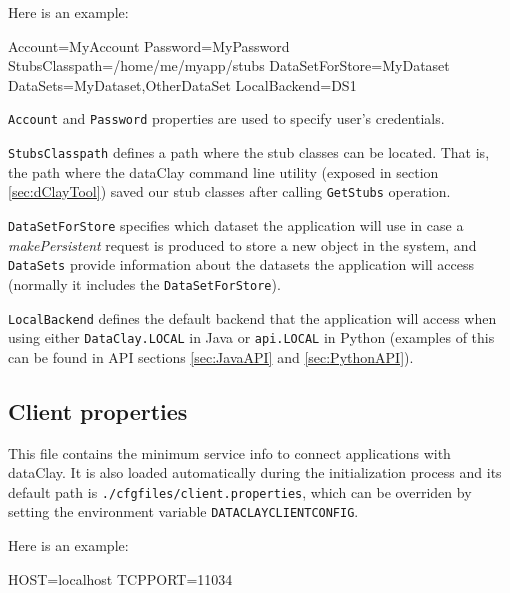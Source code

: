Here is an example:

\begin{tBox}
 \begin{bash}
  Account=MyAccount
  Password=MyPassword
  StubsClasspath=/home/me/myapp/stubs
  DataSetForStore=MyDataset
  DataSets=MyDataset,OtherDataSet
  LocalBackend=DS1
 \end{bash}
\end{tBox}

\texttt{Account} and \texttt{Password} properties are used to specify user's credentials. 

\texttt{StubsClasspath} defines a path where the stub classes can be located. That is, the path where the dataClay command line utility (exposed in section \ref{sec:dClayTool}) saved our stub classes after calling \texttt{GetStubs} operation.

\texttt{DataSetForStore} specifies which dataset the application will use in case a \textit{makePersistent} request is produced to store a new object in the system, and \texttt{DataSets} provide information about the datasets the application will access (normally it includes the \texttt{DataSetForStore}). 

\texttt{LocalBackend} defines the default backend that the application will access when using either \texttt{DataClay.LOCAL} in Java or \texttt{api.LOCAL} in Python (examples of this can be found in API sections \ref{sec:JavaAPI} and \ref{sec:PythonAPI}). 


\subsection{Client properties}
This file contains the minimum service info to connect applications with dataClay. It is also loaded automatically during the initialization process and its default path is \texttt{./cfgfiles/client.properties}, which can be overriden by setting the environment variable \texttt{DATACLAYCLIENTCONFIG}.

Here is an example:

\begin{tBox}
 \begin{bash}
 HOST=localhost
 TCPPORT=11034
 \end{bash}
\end{tBox}

